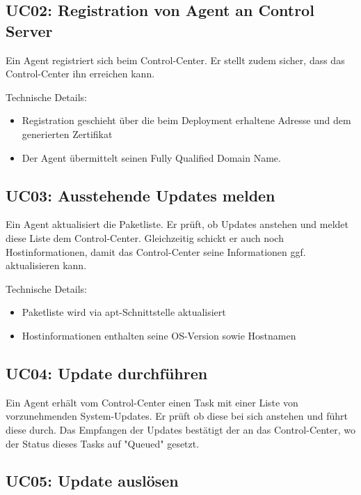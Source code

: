 \subsection*{UC02: Registration von Agent an Control Server}
\label{sec:uc_02}

Ein Agent registriert sich beim Control-Center. Er stellt zudem sicher, dass das Control-Center ihn erreichen kann.
 
Technische Details:

\begin{itemize}
    \item Registration geschieht über die beim Deployment erhaltene Adresse und dem generierten Zertifikat
    \item Der Agent übermittelt seinen Fully Qualified Domain Name.
\end{itemize}

\subsection*{UC03: Ausstehende Updates melden}
\label{sec:uc_03}

Ein Agent aktualisiert die Paketliste. Er prüft, ob Updates anstehen und meldet diese Liste dem Control-Center. Gleichzeitig schickt er auch noch Hostinformationen, damit das Control-Center seine Informationen ggf. aktualisieren kann.
 

Technische Details:

\begin{itemize}
    \item Paketliste wird via apt-Schnittstelle aktualisiert
    \item Hostinformationen enthalten seine OS-Version sowie Hostnamen
\end{itemize}

\subsection*{UC04: Update durchführen}
\label{sec:uc_04}

Ein Agent erhält vom Control-Center einen Task mit einer Liste von vorzunehmenden System-Updates. Er prüft ob diese bei sich anstehen und führt diese durch. Das Empfangen der Updates bestätigt der an das Control-Center, wo der Status dieses Tasks auf "Queued" gesetzt.

\subsection*{UC05: Update auslösen}
\label{sec:uc_05}

